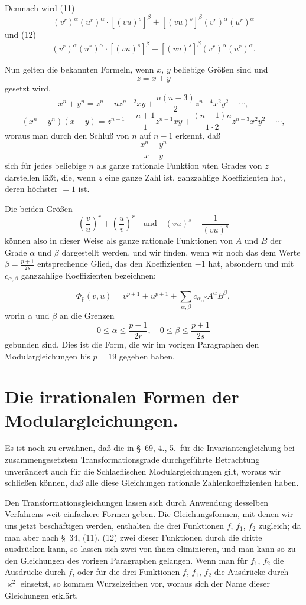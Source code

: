 \documentclass[12pt,a4paper]{article}
\theoremstyle{definition}
\begin{document}
Demnach wird (11)
\[
(v^r)^\alpha (u^r)^\alpha \cdot [(vu)^s]^\beta + [(vu)^s]^\beta (v^r)^\alpha (u^r)^\alpha
\]
und (12)
\[
(v^r)^\alpha (u^r)^\alpha \cdot [(vu)^s]^\beta - [(vu)^s]^\beta (v^r)^\alpha (u^r)^\alpha.
\]

Nun gelten die bekannten Formeln, wenn $x$, $y$ beliebige Größen sind und
\[
z = x + y
\]
gesetzt wird,
\[
x^n + y^n = z^n - n z^{n-2} xy + \frac{n(n-3)}{2} z^{n-4} x^2 y^2 - \cdots,
\]
\[
(x^n - y^n)(x - y) = z^{n+1} - \frac{n+1}{1} z^{n-1} xy + \frac{(n+1)n}{1 \cdot 2} z^{n-3} x^2 y^2 - \cdots,
\]
woraus man durch den Schluß von $n$ auf $n-1$ erkennt, daß
\[
\frac{x^n - y^n}{x - y}
\]
sich für jedes beliebige $n$ als ganze rationale Funktion $n$ten Grades von $z$ darstellen läßt, die, wenn $z$ eine ganze Zahl ist, ganzzahlige Koeffizienten hat, deren höchster $=1$ ist.

Die beiden Größen
\[
\left(\frac{v}{u}\right)^r + \left(\frac{u}{v}\right)^r \quad \text{und} \quad (vu)^s - \frac{1}{(vu)^s}
\]
können also in dieser Weise als ganze rationale Funktionen von $A$ und $B$ der Grade $\alpha$ und $\beta$ dargestellt werden, und wir finden, wenn wir noch das dem Werte $\beta = \frac{p+1}{2s}$ entsprechende Glied, das den Koeffizienten $-1$ hat, absondern und mit $c_{\alpha,\beta}$ ganzzahlige Koeffizienten bezeichnen:

\begin{equation}\label{eq:74-14}
\Phi_p(v, u) = v^{p+1} + u^{p+1} + \sum_{\alpha,\beta} c_{\alpha,\beta} A^\alpha B^\beta,
\end{equation}
worin $\alpha$ und $\beta$ an die Grenzen
\[
0 \leq \alpha \leq \frac{p-1}{2r}, \quad 0 \leq \beta \leq \frac{p+1}{2s}
\]
gebunden sind. Dies ist die Form, die wir im vorigen Paragraphen den Modulargleichungen bis $p = 19$ gegeben haben.


\section{Die irrationalen Formen der Modulargleichungen.}\label{sec:75}

Es ist noch zu erwähnen, daß die in \S\ 69, 4., 5.\ für die Invariantengleichung bei zusammengesetztem Transformationsgrade durchgeführte Betrachtung unverändert auch für die Schlaeflischen Modulargleichungen gilt, woraus wir schließen können, daß alle diese Gleichungen rationale Zahlenkoeffizienten haben.

Den Transformationsgleichungen lassen sich durch Anwendung desselben Verfahrens weit einfachere Formen geben. Die Gleichungsformen, mit denen wir uns jetzt beschäftigen werden, enthalten die drei Funktionen $f$, $f_1$, $f_2$ zugleich; da man aber nach \S\ 34, (11), (12) zwei dieser Funktionen durch die dritte ausdrücken kann, so lassen sich zwei von ihnen eliminieren, und man kann so zu den Gleichungen des vorigen Paragraphen gelangen. Wenn man für $f_1$, $f_2$ die Ausdrücke durch $f$, oder für die drei Funktionen $f$, $f_1$, $f_2$ die Ausdrücke durch $\varkappa^2$ einsetzt, so kommen Wurzelzeichen vor, woraus sich der Name dieser Gleichungen erklärt.
\end{document}
